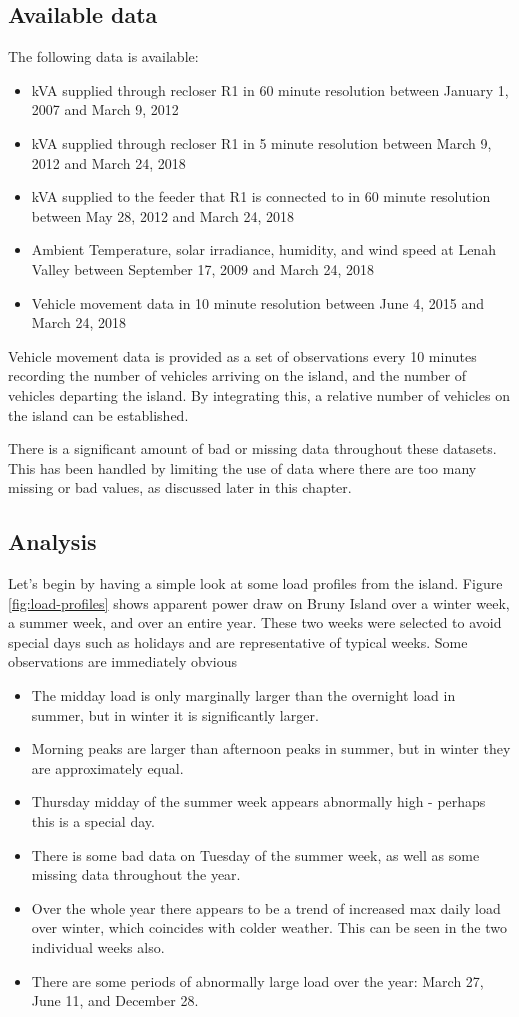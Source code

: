 \subsection{Available data}
The following data is available:
\begin{itemize}
	\item kVA supplied through recloser R1 in 60 minute resolution between January 1, 2007 and March 9, 2012
	\item kVA supplied through recloser R1 in 5 minute resolution between March 9, 2012 and March 24, 2018
	\item kVA supplied to the feeder that R1 is connected to in 60 minute resolution between May 28, 2012 and March 24, 2018
	\item Ambient Temperature, solar irradiance, humidity, and wind speed at Lenah Valley between September 17, 2009 and March 24, 2018
	\item Vehicle movement data in 10 minute resolution between June 4, 2015 and March 24, 2018
\end{itemize}	
Vehicle movement data is provided as a set of observations every 10 minutes recording the number of vehicles arriving on the island, and the number of vehicles departing the island.
By integrating this, a relative number of vehicles on the island can be established.

There is a significant amount of bad or missing data throughout these datasets.
This has been handled by limiting the use of data where there are too many missing or bad values, as discussed later in this chapter.	


\subsection{Analysis}
Let's begin by having a simple look at some load profiles from the island.
Figure \ref{fig:load-profiles} shows apparent power draw on Bruny Island over a winter week, a summer week, and over an entire year.
These two weeks were selected to avoid special days such as holidays and are representative of typical weeks.
Some observations are immediately obvious
\begin{itemize}
	\item The midday load is only marginally larger than the overnight load in summer, but in winter it is significantly larger.
	\item Morning peaks are larger than afternoon peaks in summer, but in winter they are approximately equal.
	\item Thursday midday of the summer week appears abnormally high - perhaps this is a special day.
	\item There is some bad data on Tuesday of the summer week, as well as some missing data throughout the year.
	\item Over the whole year there appears to be a trend of increased max daily load over winter, which coincides with colder weather. This can be seen in the two individual weeks also.
	\item There are some periods of abnormally large load over the year: March 27, June 11, and December 28.
\end{itemize}

